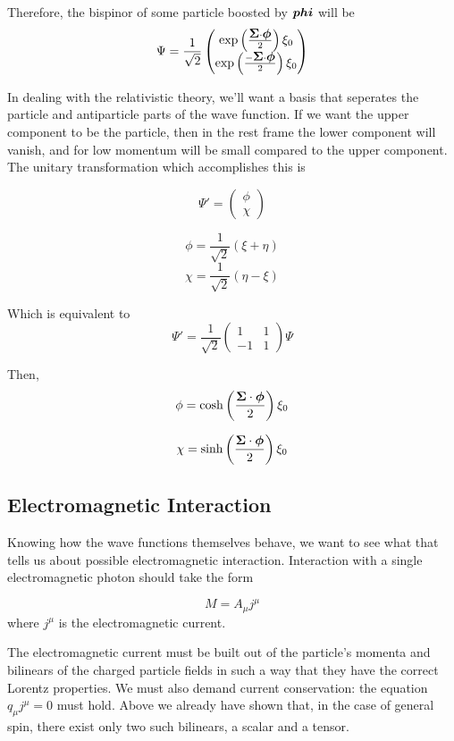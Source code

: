 Therefore, the bispinor of some particle boosted by $\mbox{\boldmath$ phi $}$ will be
\[
\Psi = \frac{1}{\sqrt{2}} \begin{pmatrix} 
		\exp\left( \frac{\mbox{\boldmath$ \Sigma $} \cdot \mbox{\boldmath$ \phi $} }{2} \right)\xi_0 \\ 
		\exp \left( \frac{-\mbox{\boldmath$ \Sigma $} \cdot \mbox{\boldmath$ \phi $} }{2} \right) \xi_0 
	\end{pmatrix}
\]


In dealing with the relativistic theory, we'll want a basis that seperates the particle and antiparticle parts of the wave function.  If we want the upper component to be the particle, then in the rest frame the lower component will vanish, and for low momentum will be small compared to the upper component.  The unitary transformation which accomplishes this is

\[
	\Psi' = \begin{pmatrix} \phi \\ \chi \end{pmatrix}
\]

\[
	\phi = \frac{1}{\sqrt{2}}(\xi + \eta)
\]
\[
	\chi = \frac{1}{\sqrt{2}}( \eta - \xi)
\]

Which is equivalent to
\[
	\Psi' = \frac{1}{\sqrt{2}} \begin{pmatrix}1 & 1 \\ -1 & 1 \end{pmatrix} \Psi
\]

Then,
\[
	\phi =  \cosh \left( \frac{\mbox{\boldmath$ \Sigma $} \cdot \mbox{\boldmath$ \phi $} }{2} \right ) \xi_0
\]

\[
	\chi =  \sinh \left( \frac{\mbox{\boldmath$ \Sigma $} \cdot \mbox{\boldmath$ \phi $} }{2} \right ) \xi_0
\]




\subsection{Electromagnetic Interaction}
Knowing how the wave functions themselves behave, we want to see what that tells us about possible electromagnetic interaction.  Interaction with a single electromagnetic photon should take the form

\[
	M = A_\mu j^\mu 
\]
where $j^\mu$ is the electromagnetic current.


The electromagnetic current must be built out of the particle's momenta and bilinears of the charged particle fields in such a way that they have the correct Lorentz properties.  We must also demand current conservation: the equation $q_\mu j^\mu = 0$ must hold.  Above we already have shown that, in the case of general spin, there exist only two such bilinears, a scalar and a tensor.

